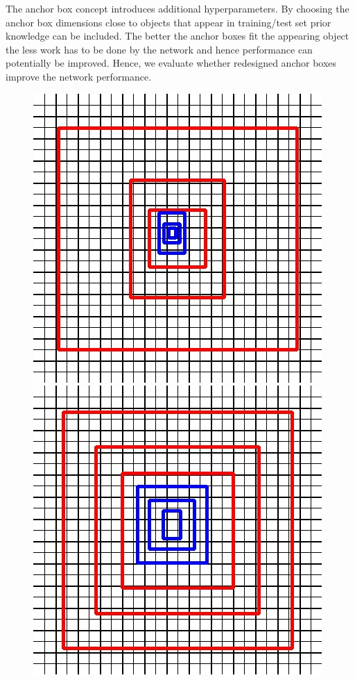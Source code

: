 	The anchor box concept introduces additional hyperparameters. By choosing the anchor box dimensions close to objects that appear in training/test set prior knowledge can be included. The better the anchor boxes fit the appearing object the less work has to be done by the network and hence performance can potentially be improved. Hence, we evaluate whether redesigned anchor boxes improve the network performance. 
	
	\begin{figure}[hbtp]
		\centering
		\begin{minipage}{0.3\textwidth}
			\includegraphics[width=\textwidth]{fig/yolov3_anchors}
		\end{minipage}
		\begin{minipage}{0.3\textwidth}
			\includegraphics[width=\textwidth]{fig/gate_anchors}

\end{minipage}
\end{figure}
